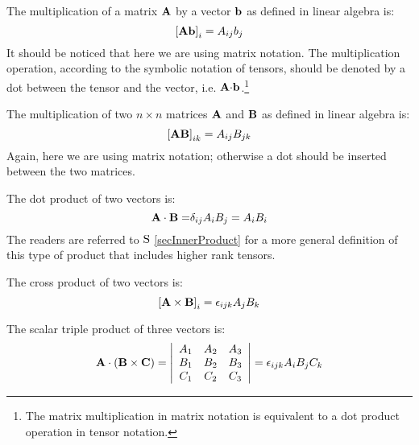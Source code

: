  The multiplication of a matrix $\vector{A}$ by a vector
$\vector{b}$ as defined in linear algebra is:
\begin{equation}
\left[\vector{A}\vector{b}\right]_{i}=A_{ij}b_{j}
\end{equation}
It should be noticed that here we are using matrix notation. The multiplication
operation, according to the symbolic notation of tensors, should be
denoted by a dot between the tensor and the vector, i.e. 
$\vector{A}\vector{\cdot b}$.\footnote{The matrix multiplication in matrix 
notation is equivalent to a dot
product operation in tensor notation.}

 The multiplication of two $n\times n$ matrices $\vector{A}$
and $\vector{B}$ as defined in linear algebra is:
\begin{equation}
\left[\vector{A}\vector{B}\right]_{ik}=A_{ij}B_{jk}\label{eqMatrixMultiplication
}
\end{equation}
Again, here we are using matrix notation; otherwise a dot should be
inserted between the two matrices.

 The dot product of two vectors is:
\begin{equation}
\vector{A}\cdot\vector{B=}\delta_{ij}A_{i}B_{j}=A_{i}B_{i}\label{eqDotProduct}
\end{equation}
The readers are referred to $\S$ \ref{secInnerProduct} for a more
general definition of this type of product that includes higher rank
tensors.

 The cross product of two vectors is:
\begin{equation}
\left[\vector{A}\times\vector{B}\right]_{i}=\epsilon_{ijk}A_{j}B_{k}\label{
EqCrossProduct}
\end{equation}


 The scalar triple product of three vectors is:
\begin{equation}
\vector{A}\cdot\left(\vector{B}\times\vector{C}\right)=\begin{vmatrix}
\begin{array}{ccc}
A_{1} & A_{2} & A_{3}\\
B_{1} & B_{2} & B_{3}\\
C_{1} & C_{2} & C_{3}
\end{array}\end{vmatrix}=\epsilon_{ijk}A_{i}B_{j}C_{k}\label{
EqScalarTripleProduct}
\end{equation}


